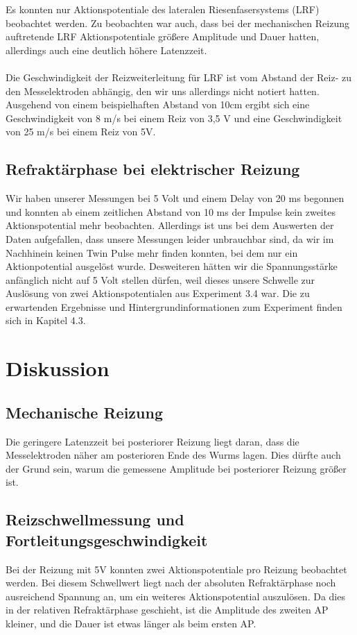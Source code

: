 \documentclass[a4paper]{article}
\begin{document}
Es konnten nur Aktionspotentiale des lateralen Riesenfasersystems (LRF) beobachtet werden. Zu beobachten war auch, dass bei der mechanischen Reizung auftretende LRF Aktionspotentiale größere Amplitude und Dauer hatten, allerdings auch eine deutlich höhere Latenzzeit.\\ \\
Die Geschwindigkeit der Reizweiterleitung für LRF ist vom Abstand der Reiz- zu den Messelektroden abhängig, den wir uns allerdings nicht notiert hatten. Ausgehend von einem beispielhaften Abstand von 10cm ergibt sich eine Geschwindigkeit von 8 m/s bei einem Reiz von 3,5 V und eine Geschwindigkeit von 25 m/s bei einem Reiz von 5V.

\subsection{Refraktärphase bei elektrischer Reizung}
Wir haben unserer Messungen bei 5 Volt und einem Delay von 20 ms begonnen und konnten ab einem zeitlichen Abstand von 10 ms der Impulse kein zweites Aktionspotential mehr beobachten. Allerdings ist uns bei dem Auswerten der Daten aufgefallen, dass unsere Messungen leider unbrauchbar sind, da wir im Nachhinein keinen Twin Pulse mehr finden konnten, bei dem nur ein Aktionpotential ausgelöst wurde. Desweiteren hätten wir die Spannungsstärke anfänglich nicht auf 5 Volt stellen dürfen, weil dieses unsere Schwelle zur Auslösung von zwei Aktionspotentialen aus Experiment 3.4 war. Die zu erwartenden Ergebnisse und Hintergrundinformationen zum Experiment finden sich in Kapitel 4.3.

\section{Diskussion}

\subsection{Mechanische Reizung}
Die geringere Latenzzeit bei posteriorer Reizung liegt daran, dass die Messelektroden näher am posterioren Ende des Wurms lagen. Dies dürfte auch der Grund sein, warum die gemessene Amplitude bei posteriorer Reizung größer ist.

\subsection{Reizschwellmessung und Fortleitungsgeschwindigkeit}
Bei der Reizung mit 5V konnten zwei Aktionspotentiale pro Reizung beobachtet werden. Bei diesem Schwellwert liegt nach der absoluten Refraktärphase noch ausreichend Spannung an, um ein weiteres Aktionspotential auszulösen. Da dies in der relativen Refraktärphase geschieht, ist die Amplitude des zweiten AP kleiner, und die Dauer ist etwas länger als beim ersten AP.
\end{document}
